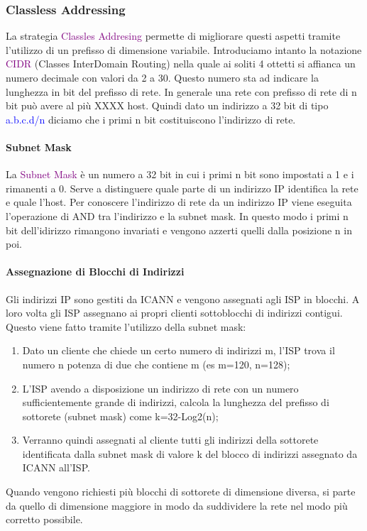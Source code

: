 \subsubsection{Classless Addressing}
La strategia \textcolor{purple}{Classles Addresing} permette di migliorare questi aspetti tramite l'utilizzo di un prefisso di dimensione variabile.
Introduciamo intanto la notazione \textcolor{purple}{CIDR} (Classes InterDomain Routing) nella quale ai soliti 4 ottetti si affianca un numero decimale con valori da 2 a 30.
Questo numero sta ad indicare la lunghezza in bit del prefisso di rete. In generale una rete con prefisso di rete di n bit può avere al più XXXX host.
Quindi dato un indirizzo a 32 bit di tipo \textcolor{blue}{a.b.c.d/n} diciamo che i primi n bit costituiscono l'indirizzo di rete.

\paragraph{Subnet Mask}
La \textcolor{purple}{Subnet Mask} è un numero a 32 bit in cui i primi n bit sono impostati a 1 e i rimanenti a 0. Serve a distinguere quale parte di un indirizzo IP identifica la rete e quale l'host.
Per conoscere l'indirizzo di rete da un indirizzo IP viene eseguita l'operazione di AND tra l'indirizzo e la subnet mask. In questo modo i primi n bit dell'idirizzo rimangono invariati e vengono azzerti quelli dalla posizione n in poi.

\paragraph{Assegnazione di Blocchi di Indirizzi} Gli indirizzi IP sono gestiti da ICANN e vengono assegnati agli ISP in blocchi. 
A loro volta gli ISP assegnano ai propri clienti sottoblocchi di indirizzi contigui. 
\\Questo viene fatto tramite l'utilizzo della subnet mask:
\begin{enumerate}
    \item Dato un cliente che chiede un certo numero di indirizzi m, l'ISP trova il numero n potenza di due che contiene m (es m=120, n=128);
    \item L'ISP avendo a disposizione un indirizzo di rete con un numero sufficientemente grande di indirizzi, calcola la lunghezza del prefisso di sottorete (subnet mask) come k=32-Log2(n);
    \item Verranno quindi assegnati al cliente tutti gli indirizzi della sottorete identificata dalla subnet mask di valore k del blocco di indirizzi assegnato da ICANN all'ISP.
\end{enumerate}
Quando vengono richiesti più blocchi di sottorete di dimensione diversa, si parte da quello di dimensione maggiore in modo da suddividere la rete nel modo più corretto possibile.

